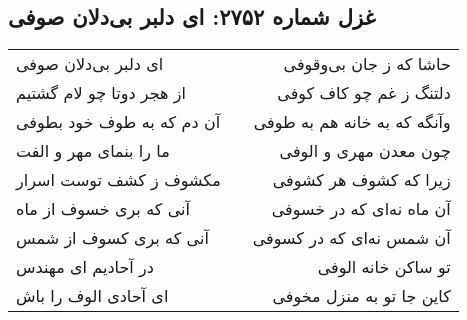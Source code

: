 \begin{center}
\section*{غزل شماره ۲۷۵۲: ای دلبر بی‌دلان صوفی}
\label{sec:2752}
\begin{longtable}{l p{0.5cm} r}
ای دلبر بی‌دلان صوفی
&&
حاشا که ز جان بی‌وقوفی
\\
از هجر دوتا چو لام گشتیم
&&
دلتنگ ز غم چو کاف کوفی
\\
آن دم که به طوف خود بطوفی
&&
وآنگه که به خانه هم به طوفی
\\
ما را بنمای مهر و الفت
&&
چون معدن مهری و الوفی
\\
مکشوف ز کشف توست اسرار
&&
زیرا که کشوف هر کشوفی
\\
آنی که بری خسوف از ماه
&&
آن ماه نه‌ای که در خسوفی
\\
آنی که بری کسوف از شمس
&&
آن شمس نه‌ای که در کسوفی
\\
در آحادیم ای مهندس
&&
تو ساکن خانه الوفی
\\
ای آحادی الوف را باش
&&
کاین جا تو به منزل مخوفی
\\
\end{longtable}
\end{center}
